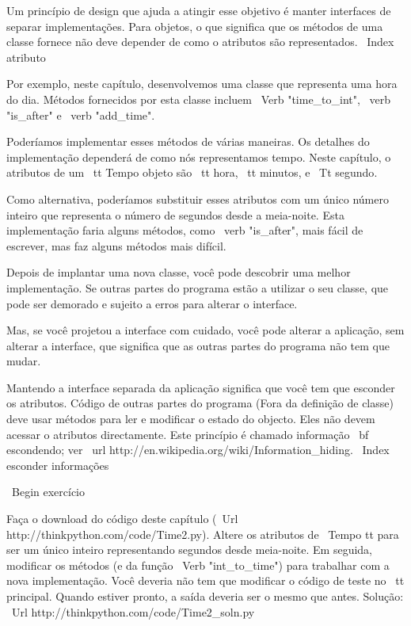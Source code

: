 \documentclass[10pt]{book}
\begin{document}
\begin {itemize}
{{{{{{{{{{{{{{Um princípio de design que ajuda a atingir esse objetivo é manter
interfaces de separar implementações. Para objetos, o que significa
que os métodos de uma classe fornece não deve depender de como o
atributos são representados.
\ Index {atributo}

Por exemplo, neste capítulo, desenvolvemos uma classe que representa
uma hora do dia. Métodos fornecidos por esta classe incluem
\ Verb "time_to_int", \ verb "is_after" e \ verb "add_time".

Poderíamos implementar esses métodos de várias maneiras. Os detalhes do
implementação dependerá de como nós representamos tempo. Neste capítulo, o
atributos de um {\ tt Tempo} objeto são {\ tt hora}, {\ tt minutos}, e
{\ Tt segundo}.

Como alternativa, poderíamos substituir esses atributos com
um único número inteiro que representa o número de segundos
desde a meia-noite. Esta implementação faria alguns métodos,
como \ verb "is_after", mais fácil de escrever, mas faz alguns métodos
mais difícil.

Depois de implantar uma nova classe, você pode descobrir uma melhor
implementação. Se outras partes do programa estão a utilizar o seu
classe, que pode ser demorado e sujeito a erros para alterar o
interface.  

Mas, se você projetou a interface com cuidado, você pode
alterar a aplicação, sem alterar a interface, que
significa que as outras partes do programa não tem que mudar.

Mantendo a interface separada da aplicação significa que
você tem que esconder os atributos. Código de outras partes do programa
(Fora da definição de classe) deve usar métodos para ler
e modificar o estado do objecto. Eles não devem acessar o
atributos directamente. Este princípio é chamado {informação \ bf escondendo};
ver \ url {http://en.wikipedia.org/wiki/Information_hiding}.
\ Index {esconder informações}

\ Begin {} exercício

Faça o download do código deste capítulo
(\ Url {http://thinkpython.com/code/Time2.py}). Altere os atributos
de {\ Tempo tt} para ser um único inteiro representando segundos desde
meia-noite. Em seguida, modificar os métodos (e da função
\ Verb "int_to_time") para trabalhar com a nova implementação. Você deveria
não tem que modificar o código de teste no {\ tt principal}. Quando estiver pronto,
a saída deveria ser o mesmo que antes. Solução:
\ Url {http://thinkpython.com/code/Time2_soln.py}

}}}}}}}}}}}}}}
\end{itemize}
\end{document}
